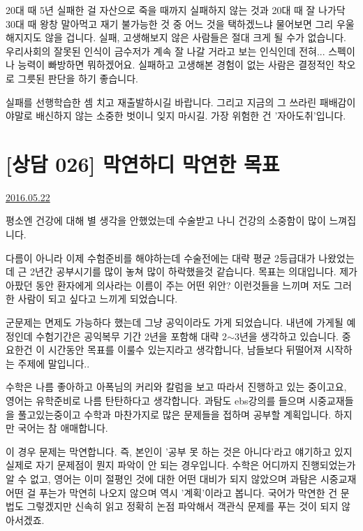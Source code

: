 20대 때 5년 실패한 걸 자산으로 죽을 때까지 실패하지 않는 것과
20대 때 잘 나가닥 30대 때 왕창 말아먹고 재기 불가능한 것 중 어느 것을 택하겠느냐 물어보면 그리 우울해지지도 않을 겁니다.
실패, 고생해보지 않은 사람들은 절대 크게 될 수가 없습니다.
우리사회의 잘못된 인식이 금수저가 계속 잘 나갈 거라고 보는 인식인데 전혀... 스펙이나 능력이 빠방하면 뭐하겠어요.
실패하고 고생해본 경험이 없는 사람은 결정적인 착오로 그릇된 판단을 하기 좋습니다.
\vspace{5mm}

실패를 선행학습한 셈 치고 재출발하시길 바랍니다. 그리고 지금의 그 쓰라린 패배감이야말로 배신하지 않는 소중한 벗이니 잊지 마시길.
가장 위험한 건 '자아도취'입니다.
\vspace{5mm}



\section{[상담 026] 막연하디 막연한 목표}
\href{https://www.kockoc.com/Apoc/787223}{2016.05.22}

\vspace{5mm}

평소엔 건강에 대해 별 생각을 안했었는데 수술받고 나니 건강의 소중함이 많이 느껴집니다.
\vspace{5mm}

다름이 아니라 이제 수험준비를 해야하는데 수술전에는 대략 평균 2등급대가 나왔었는데 근 2년간 공부시기를 많이 놓쳐 많이 하락했을것 같습니다. 목표는 의대입니다. 제가 아팠던 동안 환자에게 의사라는 이름이 주는 어떤 위안? 이런것들을 느끼며 저도 그러한 사람이 되고 싶다고 느끼게 되었습니다.
\vspace{5mm}

군문제는 면제도 가능하다 했는데 그냥 공익이라도 가게 되었습니다. 내년에 가게될 예정인데 수험기간은 공익복무 기간 2년을 포함해 대략 2$\sim$3년을 생각하고 있습니다. 중요한건 이 시간동안 목표를 이룰수 있는지라고 생각합니다, 남들보다 뒤떨어져 시작하는 주제에 말입니다..
\vspace{5mm}

수학은 나름 좋아하고 아폭님의 커리와 칼럼을 보고 따라서 진행하고 있는 중이고요, 영어는 유학준비로 나름 탄탄하다고 생각합니다.
과탐도 ebs강의를 들으며 시중교재들을 풀고있는중이고 수학과 마찬가지로 많은 문제들을 접하며 공부할 계획입니다. 하지만 국어는 참 애매합니다.
\vspace{5mm}

이 경우 문제는 막연합니다. 즉, 본인이 '공부 못 하는 것은 아니다'라고 얘기하고 있지 실제로 자기 문제점이 뭔지 파악이 안 되는 경우입니다.
수학은 어디까지 진행되었는가 알 수 없고, 영어는 이미 절평인 것에 대한 어떤 대비가 되지 않았으며
과탐은 시중교재 어떤 걸 푸는가 막연히 나오지 않으며 역시 '계획'이라고 봅니다.
국어가 막연한 건 문법도 그렇겠지만 신속히 읽고 정확히 논점 파악해서 객관식 문제를 푸는 것이 되지 않아서겠죠.
\vspace{5mm}

